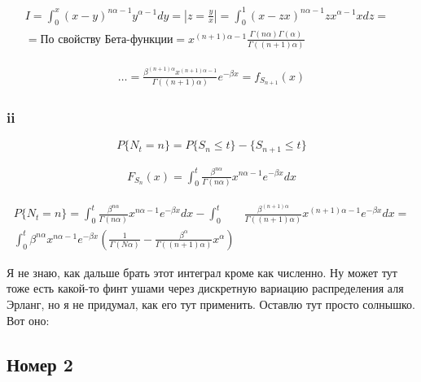 \documentclass[a4paper,12pt]{article}
\begin{document}
\begin{equation}
\begin{aligned}
I = \int_{0}^{x} (x-y)^{n\alpha - 1} y^{\alpha-1} dy = |z = \frac{y}{x}| = \int_{0}^{1} (x - zx)^{n\alpha - 1}zx^{\alpha-1} x dz =&\\ = \text{По свойству Бета-функции} = x^{(n+1)\alpha - 1} \frac{\Gamma(n\alpha) \Gamma(\alpha)}{\Gamma((n+1)\alpha)}
\end{aligned}
\end{equation}


\begin{equation}
\begin{aligned}
\dots = \frac{\beta^{(n+1)\alpha} x^{(n+1) \alpha - 1}}{\Gamma((n+1)\alpha)} e^{-\beta x} = f_{S_{n+1}}(x)
\end{aligned}
\end{equation}

\subsubsection{ii}

\[ P\{N_t = n\} = P\{S_n \le t\} - {\{ S_{n+1} \le t \}} \]


\begin{equation}
\begin{aligned}
F_{S_n}(x) = \int_{0}^{t} \frac{\beta^{n\alpha}}{\Gamma(n\alpha)} x^{n\alpha-1} e^{-\beta x} dx
\end{aligned}
\end{equation}

\begin{equation}
\begin{aligned}
 P\{N_t = n\} = \int_{0}^{t} \frac{\beta^{n\alpha}}{\Gamma(n\alpha)} x^{n\alpha-1} e^{-\beta x} dx - \int_{0}^{t} & \frac{\beta^{(n+1)\alpha}}{\Gamma((n+1)\alpha)} x^{(n+1)\alpha-1} e^{-\beta x} dx = \\
 \int_{0}^{t} \beta^{n\alpha} x^{n\alpha-1} e^{-\beta x} (\frac{1}{\Gamma(N\alpha)} - \frac{\beta^\alpha}{\Gamma((n+1)\alpha)}x^\alpha) 
\end{aligned}
\end{equation}

Я не знаю, как дальше брать этот интеграл кроме как численно. Ну может тут тоже есть какой-то финт ушами через дискретную вариацию распределения аля Эрланг, но я не придумал, как его тут применить. Оставлю тут просто солнышко. Вот оно: \Sun


\subsection{Номер 2}
\end{document}
